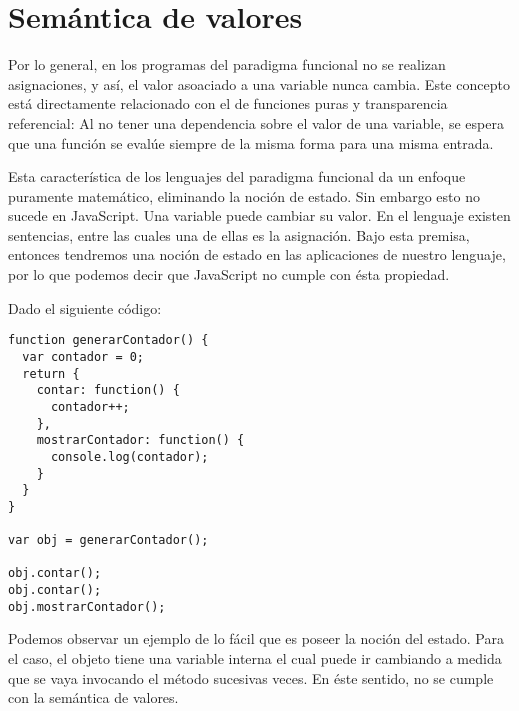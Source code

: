 \section{Semántica de valores}

Por lo general, en los programas del paradigma funcional no se realizan asignaciones, y así, el valor asoaciado a una variable nunca cambia. Este concepto está directamente relacionado con el de funciones puras y transparencia referencial: Al no tener una dependencia sobre el valor de una variable, se espera que una función se evalúe siempre de la misma forma para una misma entrada.

Esta característica de los lenguajes del paradigma funcional da un enfoque puramente matemático, eliminando la noción de estado. Sin embargo esto no sucede en JavaScript. Una variable puede cambiar su valor. En el lenguaje existen sentencias, entre las cuales una de ellas es la asignación. Bajo esta premisa, entonces tendremos una noción de estado en las aplicaciones de nuestro lenguaje, por lo que podemos decir que JavaScript no cumple con ésta propiedad.

Dado el siguiente código:

\begin{lstlisting}[title={Noción de estado}]
function generarContador() {
  var contador = 0;
  return {
    contar: function() {
      contador++;
    },
    mostrarContador: function() {
      console.log(contador);
    }
  }
}

var obj = generarContador();

obj.contar();
obj.contar();
obj.mostrarContador();
\end{lstlisting}

Podemos observar un ejemplo de lo fácil que es poseer la noción del estado. Para el caso, el objeto tiene una variable interna  el cual puede ir cambiando a medida que se vaya invocando el método  sucesivas veces. En éste sentido, no se cumple con la semántica de valores.

